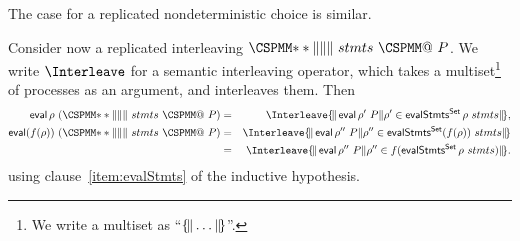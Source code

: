 



The case for a replicated nondeterministic choice is similar.  



Consider now a replicated interleaving $\M{**\|\|\|} ~ stmts ~ \M{@} ~ P$.
We write $\Interleave$ for a semantic interleaving operator, which takes a
multiset\footnote{We write a multiset as ``$\mathord{\{\!\|} \ldots \mathord{\|\!\}}$''.} of processes as
an argument, and interleaves them.  Then
\begin{eqnarray*}
\eval \rho ~(\M{**\|\|\|} ~ stmts ~ \M{@} ~ P) & = & 
  \Interleave \mset{ \eval \rho'~P \| \rho' \in \evalStmtsSet \rho~stmts }, \\
\eval (f(\rho))~(\M{**\|\|\|} ~ stmts ~ \M{@} ~ P) & = & 
  \Interleave \mset{ \eval \rho''~P \| 
     \rho'' \in \evalStmtsSet (f(\rho))~stmts } \\
& = & \Interleave \mset{ \eval \rho''~P \| 
    \rho'' \in f(\evalStmtsSet \rho~stmts) }.
\end{eqnarray*}
%
using clause~\ref{item:evalStmts} of the inductive hypothesis.

